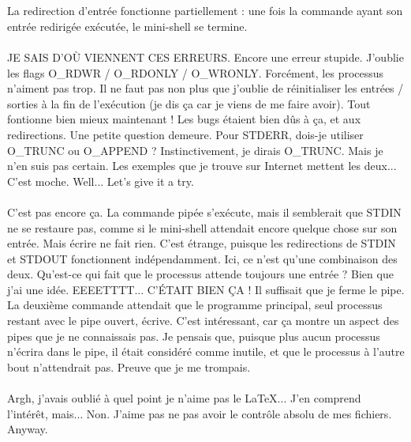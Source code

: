 \\\\
La redirection d'entrée fonctionne partiellement : une fois la commande ayant son entrée redirigée exécutée, le mini-shell se termine.
\\\\
JE SAIS D'OÙ VIENNENT CES ERREURS. Encore une erreur stupide. J'oublie les flags O\_RDWR / O\_RDONLY / O\_WRONLY. Forcément, les processus n'aiment pas trop. Il ne faut pas non plus que j'oublie de réinitialiser les entrées / sorties à la fin de l'exécution (je dis ça car je viens de me faire avoir). Tout fontionne bien mieux maintenant ! Les bugs étaient bien dûs à ça, et aux redirections. Une petite question demeure. Pour STDERR, dois-je utiliser O\_TRUNC ou O\_APPEND ? Instinctivement, je dirais O\_TRUNC. Mais je n'en suis pas certain. Les exemples que je trouve sur Internet mettent les deux... C'est moche. Well... Let's give it a try.
\\\\
C'est pas encore ça. La commande pipée s'exécute, mais il semblerait que STDIN ne se restaure pas, comme si le mini-shell attendait encore quelque chose sur son entrée. Mais écrire ne fait rien. C'est étrange, puisque les redirections de STDIN et STDOUT fonctionnent indépendamment. Ici, ce n'est qu'une combinaison des deux. Qu'est-ce qui fait que le processus attende toujours une entrée ? Bien que j'ai une idée. EEEETTTT... C'ÉTAIT BIEN ÇA ! Il suffisait que je ferme le pipe. La deuxième commande attendait que le programme principal, seul processus restant avec le pipe ouvert, écrive. C'est intéressant, car ça montre un aspect des pipes que je ne connaissais pas. Je pensais que, puisque plus aucun processus n'écrira dans le pipe, il était considéré comme inutile, et que le processus à l'autre bout n'attendrait pas. Preuve que je me trompais.
\\\\
Argh, j'avais oublié à quel point je n'aime pas le \LaTeX... J'en comprend l'intérêt, mais... Non. J'aime pas ne pas avoir le contrôle absolu de mes fichiers. Anyway.